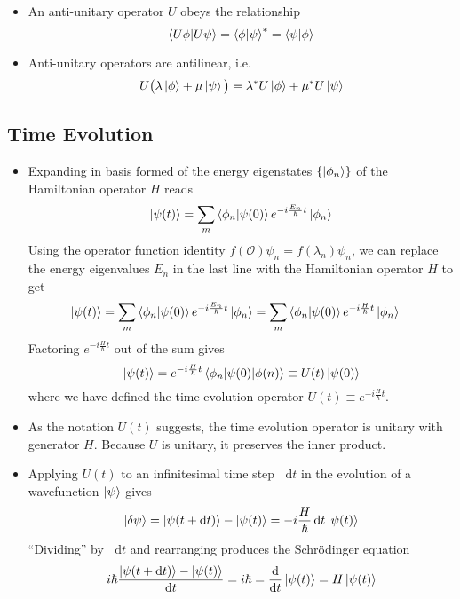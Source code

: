 \documentclass[11pt, a4paper]{article}
\newcommand{\diff}{\mathop{}\!\mathrm{d}} %
\newcommand{\Schro}{Schr\"{o}dinger\xspace}
\newcommand{\Ham}{Hamiltonian\xspace}
\renewcommand{\O}{\mathcal{O}}  %
\newcommand{\p}{\psi}  %
\begin{document}
\begin{itemize}
	\item An anti-unitary operator $ U $ obeys the relationship
	\begin{equation*}
		\braket{U\phi}{U\psi} = \braket{\phi}{\psi}^{*}= \braket{\psi}{\phi}
	\end{equation*}
	
	\item Anti-unitary operators are antilinear, i.e.
	\begin{equation*}
		U\big(\lambda \ket{\phi} + \mu \ket{\psi}\big) = \lambda^{*}U\ket{\phi} + \mu^{*}U\ket{\psi}
	\end{equation*}

\end{itemize}

\subsection{Time Evolution} \label{ss:time-ev}
\begin{itemize}
	\item Expanding in basis formed of the energy eigenstates $ \{\ket{\phi_{n}}\} $ of the \Ham operator $ H $ reads
	\begin{equation*}
		\ket{\p(t)} = \sum_{m}\braket{\phi_{n}}{\p(0)}e^{-i\frac{E_{n}}{\hbar}t}\ket{\phi_{n}}
	\end{equation*}
	Using the operator function identity $ f(\O)\psi_{n} = f(\lambda_{n} )\psi_{n} $, we can replace the energy eigenvalues $ E_{n} $ in the last line with the \Ham operator $ H $ to get
	\begin{align*}
		\ket{\p(t)} &= \sum_{m}\braket{\phi_{n}}{\p(0)} e^{-i\frac{E_{n}}{\hbar}t}\ket{\phi_{n}} = \sum_{m} \braket{\phi_{n}}{\p(0)} e^{-i\frac{H}{\hbar}t}\ket{\phi_{n}}
	\end{align*}
	Factoring $ e^{-i\frac{H}{\hbar}t} $ out of the sum gives
	\begin{equation*}
		\ket{\p(t)} = e^{-i\frac{H}{\hbar}t} \mel{\phi_{n}}{\p(0)}{\phi(n)} \equiv U(t) \ket{\p(0)}
	\end{equation*}
	where we have defined the time evolution operator $ U(t) \equiv e^{-i\frac{H}{\hbar}t} $.
	
	\item As the notation $ U(t) $ suggests, the time evolution operator is unitary with generator $ H $. Because $ U $ is unitary, it preserves the inner product.
	
	\item Applying $ U(t) $ to an infinitesimal time step $ \diff t $ in the evolution of a wavefunction $ \ket{\p} $ gives
	\begin{equation*}
		\ket{\delta \p} = \ket{\psi(t + \diff t)} - \ket{\p(t)} = -i\frac{H}{\hbar}\diff t \ket{\p(t)}
	\end{equation*}
	``Dividing'' by $ \diff t $ and rearranging produces the \Schro equation
	\begin{equation*}
		i \hbar \frac{\ket{\psi(t + \diff t)} - \ket{\p(t)}}{\diff t} = i \hbar = \dv{t}\ket{\psi(t)} = H \ket{\psi(t)}
	\end{equation*}
\end{itemize}
\end{document}
